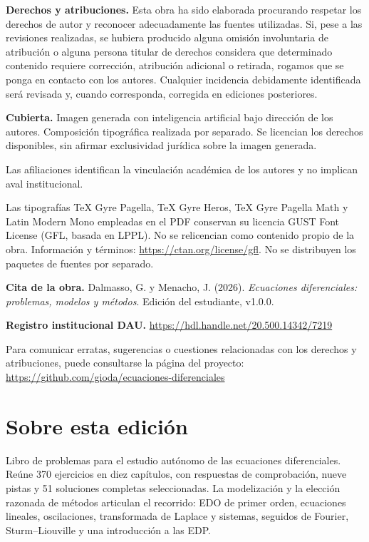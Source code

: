 \textbf{Derechos y atribuciones.} Esta obra ha sido elaborada procurando respetar los derechos de autor y reconocer adecuadamente las fuentes utilizadas. Si, pese a las revisiones realizadas, se hubiera producido alguna omisión involuntaria de atribución o alguna persona titular de derechos considera que determinado contenido requiere corrección, atribución adicional o retirada, rogamos que se ponga en contacto con los autores. Cualquier incidencia debidamente identificada será revisada y, cuando corresponda, corregida en ediciones posteriores.

\textbf{Cubierta.} Imagen generada con inteligencia artificial bajo dirección de los autores. Composición tipográfica realizada por separado. Se licencian los derechos disponibles, sin afirmar exclusividad jurídica sobre la imagen generada.

Las afiliaciones identifican la vinculación académica de los autores y no implican aval institucional.

Las tipografías TeX Gyre Pagella, TeX Gyre Heros, TeX Gyre Pagella Math y Latin Modern Mono empleadas en el PDF conservan su licencia GUST Font License (GFL, basada en LPPL). No se relicencian como contenido propio de la obra. Información y términos: \url{https://ctan.org/license/gfl}. No se distribuyen los paquetes de fuentes por separado.

\textbf{Cita de la obra.} Dalmasso, G. y Menacho, J. (2026).
\emph{Ecuaciones diferenciales: problemas, modelos y métodos}.
Edición del estudiante, v1.0.0.

\textbf{Registro institucional DAU.} \url{https://hdl.handle.net/20.500.14342/7219}\par
Para comunicar erratas, sugerencias o cuestiones relacionadas con los derechos y atribuciones, puede consultarse la página del proyecto:
\url{https://github.com/gioda/ecuaciones-diferenciales}

\clearpage
\chapter*{Sobre esta edición} Libro de problemas para el estudio autónomo de las ecuaciones diferenciales. Reúne 370 ejercicios en diez capítulos, con respuestas de comprobación, nueve pistas y 51 soluciones completas seleccionadas. La modelización y la elección razonada de métodos articulan el recorrido: EDO de primer orden, ecuaciones lineales, oscilaciones, transformada de Laplace y sistemas, seguidos de Fourier, Sturm--Liouville y una introducción a las EDP.

